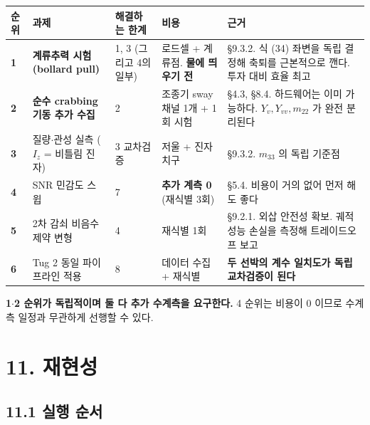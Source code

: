 \documentclass[10pt,a4paper]{article}
\begin{document}
\begin{center}\footnotesize\setlength{\tabcolsep}{3pt}
\begin{tabular}{@{}lp{2.55cm}lp{2.32cm}p{5.85cm}@{}}
\toprule
\textbf{순위} & \textbf{과제} & \textbf{해결하는 한계} & \textbf{비용} & \textbf{근거} \\
\midrule
\textbf{1} & \textbf{계류추력 시험 (bollard pull)} & 1, 3 (그리고 4의 일부) & 로드셀 + 계류점. \textbf{물에 띄우기 전} & \S{}9.3.2. 식 (34) 좌변을 독립 결정해 축퇴를 근본적으로 깬다. 투자 대비 효율 최고 \\
\textbf{2} & \textbf{순수 crabbing 기동 추가 수집} & 2 & 조종기 sway 채널 1개 + 1회 시험 & \S{}4.3, \S{}8.4. 하드웨어는 이미 가능하다. $Y_v, Y_{vv}, m_{22}$ 가 완전 분리된다 \\
\textbf{3} & 질량$\cdot$관성 실측 ($I_z$ = 비틀림 진자) & 3 교차검증 & 저울 + 진자 치구 & \S{}9.3.2. $m_{33}$ 의 독립 기준점 \\
\textbf{4} & SNR 민감도 스윕 & 7 & \textbf{추가 계측 0} (재식별 3회) & \S{}5.4. 비용이 거의 없어 먼저 해도 좋다 \\
\textbf{5} & 2차 감쇠 비음수 제약 변형 & 4 & 재식별 1회 & \S{}9.2.1. 외삽 안전성 확보. 궤적 성능 손실을 측정해 트레이드오프 보고 \\
\textbf{6} & Tug 2 동일 파이프라인 적용 & 8 & 데이터 수집 + 재식별 & \textbf{두 선박의 계수 일치도가 독립 교차검증이 된다} \\
\bottomrule
\end{tabular}
\end{center}

\textbf{1$\cdot$2 순위가 독립적이며 둘 다 추가 수계측을 요구한다.} 4 순위는 비용이 0 이므로 수계측 일정과 무관하게 선행할 수 있다.

\section*{11. 재현성}

\subsection*{11.1 실행 순서}
\end{document}
